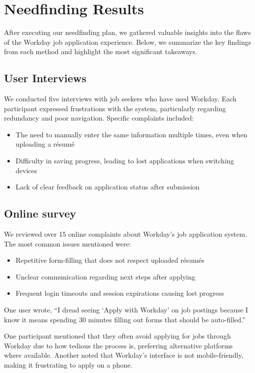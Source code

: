 \documentclass[
	letterpaper, %
]{jdf}
\begin{document}
\hfill \break
\newpage
\section{Needfinding Results }
After executing our needfinding plan, we gathered valuable insights into the flaws of the Workday job application experience. Below, we summarize the key findings from each method and highlight the most significant takeaways.

\subsection{User Interviews}
We conducted five interviews with job seekers who have used Workday. Each participant expressed frustrations with the system, particularly regarding redundancy and poor navigation. Specific complaints included:
\begin{itemize}
    \item The need to manually enter the same information multiple times, even when uploading a résumé
    \item Difficulty in saving progress, leading to lost applications when switching devices
    \item Lack of clear feedback on application status after submission
\end{itemize}
\hfill \break

\subsection{Online survey}

We reviewed over 15 online complaints about Workday’s job application system. The most common issues mentioned were:
\begin{itemize}
\item Repetitive form-filling that does not respect uploaded résumés
\item Unclear communication regarding next steps after applying
\item Frequent login timeouts and session expirations causing lost progress
\end{itemize}

One user wrote, “I dread seeing ‘Apply with Workday’ on job postings because I know it means spending 30 minutes filling out forms that should be auto-filled.”

One participant mentioned that they often avoid applying for jobs through Workday due to how tedious the process is, preferring alternative platforms where available. Another noted that Workday’s interface is not mobile-friendly, making it frustrating to apply on a phone.
\hfill \break
\end{document}
